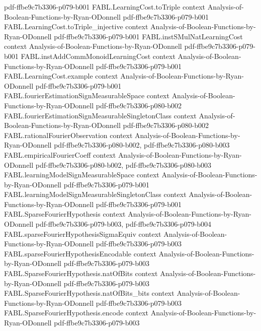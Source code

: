 \begin{theorem}
  {pdf-ffbe9c7b3306-p079-b001}
\proofstep
  {FABL.LearningCost.toTriple}
  {context}
  {Analysis-of-Boolean-Functions-by-Ryan-ODonnell}
  {pdf-ffbe9c7b3306-p079-b001}
\proofstep
  {FABL.LearningCost.toTriple_injective}
  {context}
  {Analysis-of-Boolean-Functions-by-Ryan-ODonnell}
  {pdf-ffbe9c7b3306-p079-b001}
\proofstep
  {FABL.instSMulNatLearningCost}
  {context}
  {Analysis-of-Boolean-Functions-by-Ryan-ODonnell}
  {pdf-ffbe9c7b3306-p079-b001}
\proofstep
  {FABL.instAddCommMonoidLearningCost}
  {context}
  {Analysis-of-Boolean-Functions-by-Ryan-ODonnell}
  {pdf-ffbe9c7b3306-p079-b001}
\proofstep
  {FABL.LearningCost.example}
  {context}
  {Analysis-of-Boolean-Functions-by-Ryan-ODonnell}
  {pdf-ffbe9c7b3306-p079-b001}
\proofstep
  {FABL.fourierEstimationSignMeasurableSpace}
  {context}
  {Analysis-of-Boolean-Functions-by-Ryan-ODonnell}
  {pdf-ffbe9c7b3306-p080-b002}
\proofstep
  {FABL.fourierEstimationSignMeasurableSingletonClass}
  {context}
  {Analysis-of-Boolean-Functions-by-Ryan-ODonnell}
  {pdf-ffbe9c7b3306-p080-b002}
\proofstep
  {FABL.rationalFourierObservation}
  {context}
  {Analysis-of-Boolean-Functions-by-Ryan-ODonnell}
  {pdf-ffbe9c7b3306-p080-b002,
    pdf-ffbe9c7b3306-p080-b003}
\proofstep
  {FABL.empiricalFourierCoeff}
  {context}
  {Analysis-of-Boolean-Functions-by-Ryan-ODonnell}
  {pdf-ffbe9c7b3306-p080-b002,
    pdf-ffbe9c7b3306-p080-b003}
\proofstep
  {FABL.learningModelSignMeasurableSpace}
  {context}
  {Analysis-of-Boolean-Functions-by-Ryan-ODonnell}
  {pdf-ffbe9c7b3306-p079-b001}
\proofstep
  {FABL.learningModelSignMeasurableSingletonClass}
  {context}
  {Analysis-of-Boolean-Functions-by-Ryan-ODonnell}
  {pdf-ffbe9c7b3306-p079-b001}
\proofstep
  {FABL.SparseFourierHypothesis}
  {context}
  {Analysis-of-Boolean-Functions-by-Ryan-ODonnell}
  {pdf-ffbe9c7b3306-p079-b003,
    pdf-ffbe9c7b3306-p079-b004}
\proofstep
  {FABL.sparseFourierHypothesisSigmaEquiv}
  {context}
  {Analysis-of-Boolean-Functions-by-Ryan-ODonnell}
  {pdf-ffbe9c7b3306-p079-b003}
\proofstep
  {FABL.sparseFourierHypothesisEncodable}
  {context}
  {Analysis-of-Boolean-Functions-by-Ryan-ODonnell}
  {pdf-ffbe9c7b3306-p079-b003}
\proofstep
  {FABL.SparseFourierHypothesis.natOfBits}
  {context}
  {Analysis-of-Boolean-Functions-by-Ryan-ODonnell}
  {pdf-ffbe9c7b3306-p079-b003}
\proofstep
  {FABL.SparseFourierHypothesis.natOfBits_bits}
  {context}
  {Analysis-of-Boolean-Functions-by-Ryan-ODonnell}
  {pdf-ffbe9c7b3306-p079-b003}
\proofstep
  {FABL.SparseFourierHypothesis.encode}
  {context}
  {Analysis-of-Boolean-Functions-by-Ryan-ODonnell}
  {pdf-ffbe9c7b3306-p079-b003}
\proofstep

\end{theorem}
